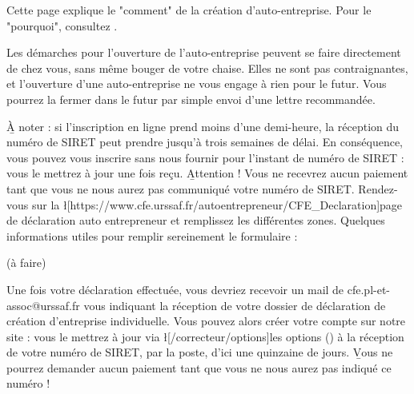 ﻿Cette page explique le "comment" de la création d'auto-entreprise. Pour le "pourquoi", consultez .

Les démarches pour l'ouverture de l'auto-entreprise peuvent se faire directement de chez vous, sans même bouger de votre chaise.
Elles ne sont pas contraignantes, et l'ouverture d'une auto-entreprise ne vous engage à rien pour le futur. Vous pourrez la fermer dans le futur par simple envoi d'une lettre recommandée.

\b{À noter} : si l'inscription en ligne prend moins d'une demi-heure, la réception du numéro de SIRET peut prendre jusqu'à trois semaines de délai. En conséquence, vous pouvez vous inscrire sans nous fournir pour l'instant de numéro de SIRET : vous le mettrez à jour une fois reçu. \b{Attention !} Vous ne recevrez aucun paiement tant que vous ne nous aurez pas communiqué votre numéro de SIRET.
Rendez-vous sur la \l[https://www.cfe.urssaf.fr/autoentrepreneur/CFE_Declaration]{page de déclaration auto entrepreneur} et remplissez les différentes zones. Quelques informations utiles pour remplir sereinement le formulaire :
\begin{itemize}
	\li (à faire)
\end{itemize}

Une fois votre déclaration effectuée, vous devriez recevoir un mail de cfe.pl-et-assoc@urssaf.fr vous indiquant la réception de votre dossier de déclaration de création d'entreprise individuelle.
Vous pouvez alors créer votre compte sur notre site : vous le mettrez à jour via \l[/correcteur/options]{les options} () à la réception de votre numéro de SIRET, par la poste, d'ici une quinzaine de jours. \b{Vous ne pourrez demander aucun paiement tant que vous ne nous aurez pas indiqué ce numéro} !